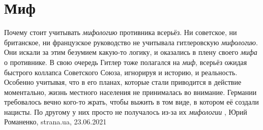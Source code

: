  
 
 
 
 
\chapter{Миф}
\label{sec:slova.mif}

Почему стоит учитывать \emph{мифологию} противника всерьёз.  Ни советское, ни
британское, ни французское руководство не учитывала гитлеровскую
\emph{мифологию}. Они искали за этим безумием какую-то логику, и оказались в
плену своего \emph{мифа} о противнике. В свою очередь Гитлер тоже полагался на
\emph{миф}, всерьёз ожидая быстрого коллапса Советского Союза, игнорируя и
историю, и реальность. Особенно учитывая, что в его планах, которые стали
приводится в действие моментально, жизнь местного населения не принималась во
внимание. Германии требовалось вечно кого-то жрать, чтобы выжить в том виде, в
котором её создали нацисты. По другому у них просто не получалось из-за их
\emph{мифологии}
, 
Юрий Романенко, strana.ua, 23.06.2021

